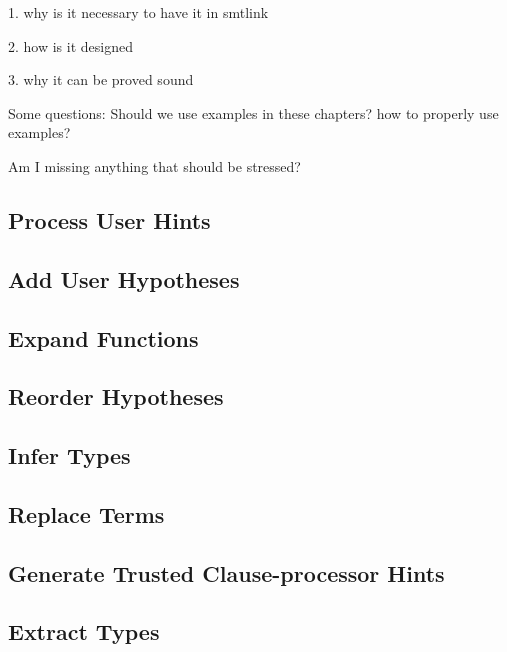 1. why is it necessary to have it in smtlink

2. how is it designed

3. why it can be proved sound

Some questions: Should we use examples in these chapters? how to properly use
examples?

Am I missing anything that should be stressed?

\subsection{Process User Hints}

\subsection{Add User Hypotheses}

\subsection{Expand Functions}

\subsection{Reorder Hypotheses}

\subsection{Infer Types}

\subsection{Replace Terms}

\subsection{Generate Trusted Clause-processor Hints}

\subsection{Extract Types}
